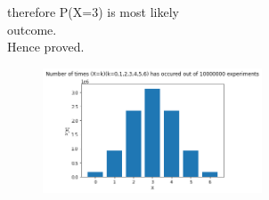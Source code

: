 \documentclass{assignment}
\begin{document}
\begin{paracol}{2}
\begin{Large}
therefore P(X=3) is most likely \\
outcome.\\
Hence proved.
\begin{figure}
\begin{center}
\includegraphics[width=0.58\textwidth]{assignment1.png}
\end{center}
\end{figure}
\end{Large}
\end{paracol}
\end{document}
